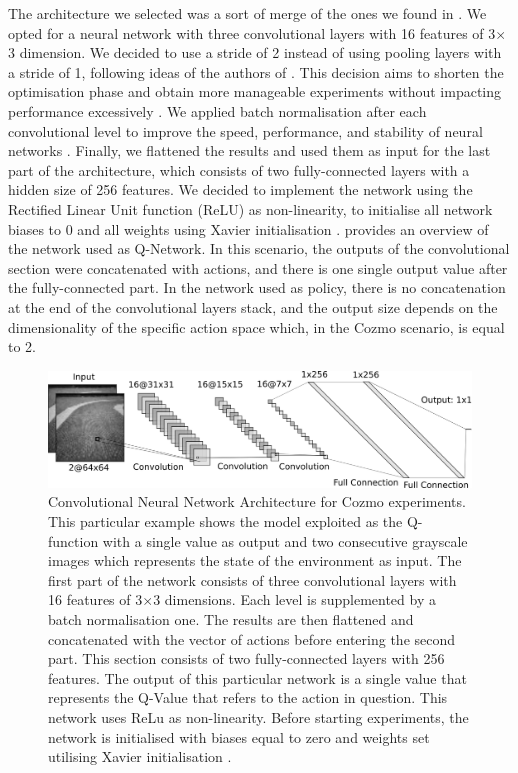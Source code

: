 The architecture we selected was a sort of merge of the ones we found in \cite{kendall2018learning,kendall2019learning,haarnoja2018alg}.
We opted for a neural network with three convolutional layers with 16 features of 3$\times$3 dimension.
We decided to use a stride of 2 instead of using pooling layers with a stride of 1, following ideas of the authors of \cite{kendall2018learning,kendall2019learning}.
This decision aims to shorten the optimisation phase and obtain more manageable experiments without impacting performance excessively \cite{springenberg2014striving}.
We applied batch normalisation after each convolutional level to improve the speed, performance, and stability of neural networks \cite{ioffe2015batch}.
Finally, we flattened the results and used them as input for the last part of the architecture, which consists of two fully-connected layers with a hidden size of 256 features.
We decided to implement the network using the Rectified Linear Unit function (ReLU) as non-linearity, to initialise all network biases to 0 and all weights using Xavier initialisation \cite{glorot2010understanding}.
 provides an overview of the network used as Q-Network.
In this scenario, the outputs of the convolutional section were concatenated with actions, and there is one single output value after the fully-connected part.
In the network used as policy, there is no concatenation at the end of the convolutional layers stack, and the output size depends on the dimensionality of the specific action space which, in the Cozmo scenario, is equal to 2.

\begin{figure}

    \centering
    \includegraphics[width=\textwidth]{img/cnn_cozmo.png}
    \caption[Convolutional Neural Network Architecture for Cozmo experiments]{ Convolutional Neural Network Architecture for Cozmo experiments.
        This particular example shows the model exploited as the Q-function with a single value as output and two consecutive grayscale images which represents the state of the environment as input.
        The first part of the network consists of three convolutional layers with 16 features of 3$\times$3 dimensions. Each level is supplemented by a batch normalisation one.
        The results are then flattened and concatenated with the vector of actions before entering the second part. This section consists of two fully-connected layers with 256 features.
        The output of this particular network is a single value that represents the Q-Value that refers to the action in question.
        This network uses ReLu as non-linearity. Before starting experiments, the network is initialised with biases equal to zero and weights set utilising Xavier initialisation \cite{glorot2010understanding}.}
    \label{fig:cnn_cozmo}
\end{figure}

